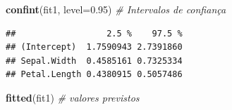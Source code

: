 \documentclass[
]{book}
\newenvironment{Shaded}{\begin{snugshade}}{\end{snugshade}}
\newcommand{\CommentTok}[1]{\textcolor[rgb]{0.56,0.35,0.01}{\textit{#1}}}
\newcommand{\DataTypeTok}[1]{\textcolor[rgb]{0.13,0.29,0.53}{#1}}
\newcommand{\FloatTok}[1]{\textcolor[rgb]{0.00,0.00,0.81}{#1}}
\newcommand{\KeywordTok}[1]{\textcolor[rgb]{0.13,0.29,0.53}{\textbf{#1}}}
\newcommand{\NormalTok}[1]{#1}
\begin{document}
\begin{Shaded}
\begin{Highlighting}[]
\KeywordTok{confint}\NormalTok{(fit1, }\DataTypeTok{level=}\FloatTok{0.95}\NormalTok{) }\CommentTok{# Intervalos de confiança}
\end{Highlighting}
\end{Shaded}

\begin{verbatim}
##                  2.5 %    97.5 %
## (Intercept)  1.7590943 2.7391860
## Sepal.Width  0.4585161 0.7325334
## Petal.Length 0.4380915 0.5057486
\end{verbatim}

\begin{Shaded}
\begin{Highlighting}[]
\KeywordTok{fitted}\NormalTok{(fit1) }\CommentTok{# valores previstos}
\end{Highlighting}
\end{Shaded}
\end{document}
